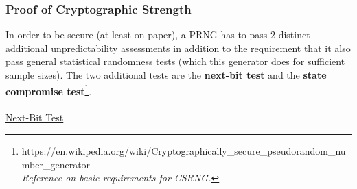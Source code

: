 \documentclass[titlepage]{report}
\begin{document}
	
	\subsubsection{Proof of Cryptographic Strength}
	
	In order to be secure (at least on paper), a PRNG has to pass 2 distinct additional unpredictability assessments in addition to the requirement that it also pass general statistical randomness tests (which this generator does for sufficient sample sizes). The two additional tests are the \textbf{next-bit test} and the \textbf{state compromise test}\footnote{https://en.wikipedia.org/wiki/Cryptographically\_secure\_pseudorandom\_number\_generator\\\textit{Reference on basic requirements for CSRNG.}}.\\\\
	\ul{Next-Bit Test}
\end{document}
